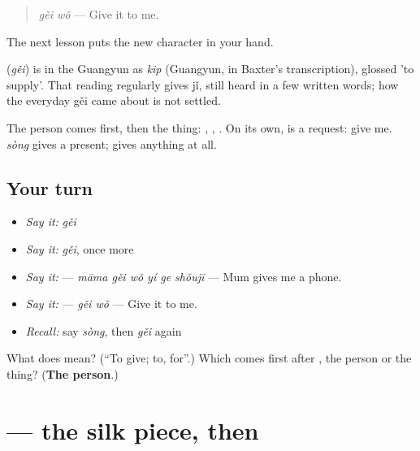 \begin{quote}
\textbf{} \emph{gěi wǒ} — Give it to me.
\end{quote}

The next lesson puts the new character in your hand.

\begin{cousinweb}
\textbf{} (\emph{gěi}) is in the Guangyun as \emph{kip} (Guangyun, in Baxter's transcription), glossed 'to supply'. That reading regularly gives jǐ, still heard in a few written words; how the everyday gěi came about is not settled.
\end{cousinweb}

\begin{grammarlens}[title={What you've built}]
The person comes first, then the thing: , , . On its own,  is a request: give me. \emph{sòng} gives a present;  gives anything at all.
\end{grammarlens}

\subsection*{Your turn}
\begin{itemize}
\raggedright
  \item \emph{Say it:} \emph{gěi}
  \item \emph{Say it:} \emph{gěi}, once more
  \item \emph{Say it:}  — \emph{māma gěi wǒ yí ge shǒujī} — Mum gives me a phone.
  \item \emph{Say it:}  — \emph{gěi wǒ} — Give it to me.
  \item \emph{Recall:} say \emph{sòng}, then \emph{gěi} again
\end{itemize}

\begin{tcolorbox}[breakable,colback=teal!4,colframe=teal!35!black,title={Before you move on}]
What does  mean? (\textquotedblleft{}To give; to, for\textquotedblright{}.) Which comes first after , the person or the thing? (\textbf{The person}.)
\end{tcolorbox}
\section[\texorpdfstring{\zh{给} (gěi)}{给 (gěi)}]{ — the silk piece, then }

\label{lesson:ZH-W89-gei}



